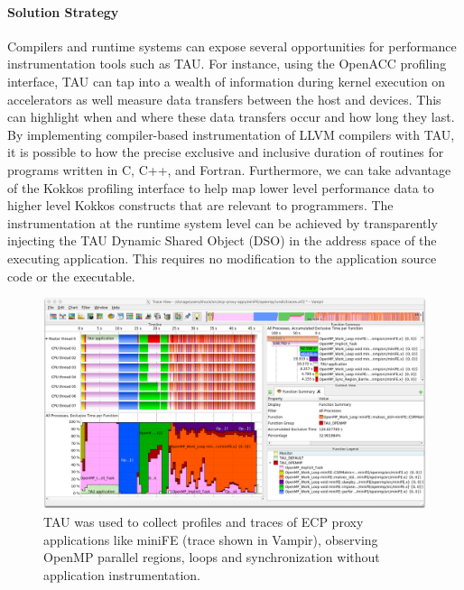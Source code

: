 \paragraph{Solution Strategy} Compilers and runtime systems can expose several opportunities for performance instrumentation tools such as TAU.  For instance, using the OpenACC profiling interface, TAU can tap into a wealth of information during kernel execution on accelerators as well measure data transfers between the host and devices. This can highlight when and where these data transfers occur and how long they last.  By implementing compiler-based instrumentation of LLVM compilers with TAU, it is possible to how the precise exclusive and inclusive duration of routines for programs written in C, C++, and Fortran.  Furthermore, we can take advantage of the Kokkos profiling interface to help map lower level performance data to higher level Kokkos constructs that are relevant to programmers. The instrumentation at the runtime system level can be achieved by transparently injecting the TAU Dynamic Shared Object (DSO) in the address space of the executing application. This requires no modification to the application source code or the executable.

\begin{figure}[htb]
\centering
\includegraphics[width=6in]{projects/2.3.2-Tools/2.3.2.10-PROTEAS-YTUNE/miniFE_openmp_tau.png}
\caption{TAU was used to collect profiles and traces of ECP proxy applications like miniFE (trace shown in Vampir), observing OpenMP parallel regions, loops and synchronization without application instrumentation.}
\label{figure:tau:openmp}
\end{figure}


